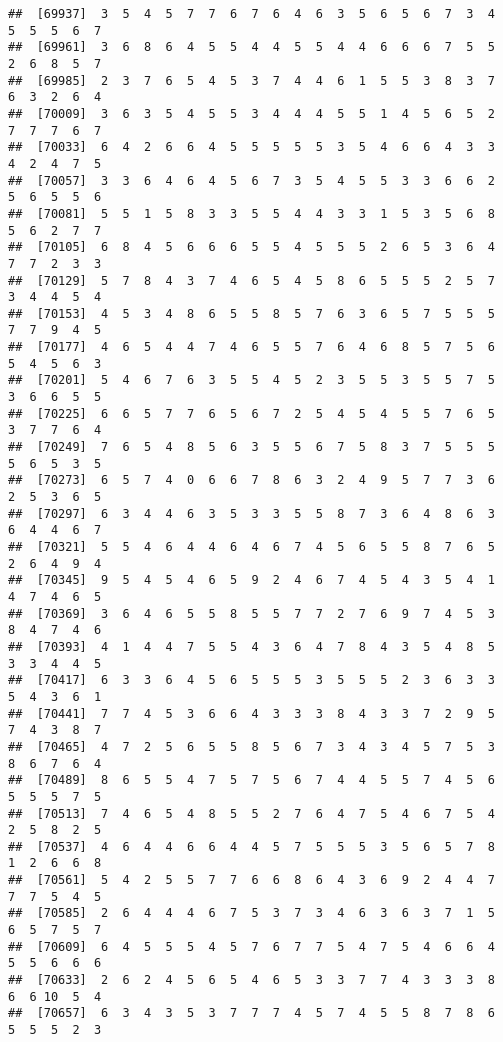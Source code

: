 \documentclass[
]{book}
\begin{document}
\begin{verbatim}
##  [69937]  3  5  4  5  7  7  6  7  6  4  6  3  5  6  5  6  7  3  4  5  5  5  6  7
##  [69961]  3  6  8  6  4  5  5  4  4  5  5  4  4  6  6  6  7  5  5  2  6  8  5  7
##  [69985]  2  3  7  6  5  4  5  3  7  4  4  6  1  5  5  3  8  3  7  6  3  2  6  4
##  [70009]  3  6  3  5  4  5  5  3  4  4  4  5  5  1  4  5  6  5  2  7  7  7  6  7
##  [70033]  6  4  2  6  6  4  5  5  5  5  5  3  5  4  6  6  4  3  3  4  2  4  7  5
##  [70057]  3  3  6  4  6  4  5  6  7  3  5  4  5  5  3  3  6  6  2  5  6  5  5  6
##  [70081]  5  5  1  5  8  3  3  5  5  4  4  3  3  1  5  3  5  6  8  5  6  2  7  7
##  [70105]  6  8  4  5  6  6  6  5  5  4  5  5  5  2  6  5  3  6  4  7  7  2  3  3
##  [70129]  5  7  8  4  3  7  4  6  5  4  5  8  6  5  5  5  2  5  7  3  4  4  5  4
##  [70153]  4  5  3  4  8  6  5  5  8  5  7  6  3  6  5  7  5  5  5  7  7  9  4  5
##  [70177]  4  6  5  4  4  7  4  6  5  5  7  6  4  6  8  5  7  5  6  5  4  5  6  3
##  [70201]  5  4  6  7  6  3  5  5  4  5  2  3  5  5  3  5  5  7  5  3  6  6  5  5
##  [70225]  6  6  5  7  7  6  5  6  7  2  5  4  5  4  5  5  7  6  5  3  7  7  6  4
##  [70249]  7  6  5  4  8  5  6  3  5  5  6  7  5  8  3  7  5  5  5  5  6  5  3  5
##  [70273]  6  5  7  4  0  6  6  7  8  6  3  2  4  9  5  7  7  3  6  2  5  3  6  5
##  [70297]  6  3  4  4  6  3  5  3  3  5  5  8  7  3  6  4  8  6  3  6  4  4  6  7
##  [70321]  5  5  4  6  4  4  6  4  6  7  4  5  6  5  5  8  7  6  5  2  6  4  9  4
##  [70345]  9  5  4  5  4  6  5  9  2  4  6  7  4  5  4  3  5  4  1  4  7  4  6  5
##  [70369]  3  6  4  6  5  5  8  5  5  7  7  2  7  6  9  7  4  5  3  8  4  7  4  6
##  [70393]  4  1  4  4  7  5  5  4  3  6  4  7  8  4  3  5  4  8  5  3  3  4  4  5
##  [70417]  6  3  3  6  4  5  6  5  5  5  3  5  5  5  2  3  6  3  3  5  4  3  6  1
##  [70441]  7  7  4  5  3  6  6  4  3  3  3  8  4  3  3  7  2  9  5  7  4  3  8  7
##  [70465]  4  7  2  5  6  5  5  8  5  6  7  3  4  3  4  5  7  5  3  8  6  7  6  4
##  [70489]  8  6  5  5  4  7  5  7  5  6  7  4  4  5  5  7  4  5  6  5  5  5  7  5
##  [70513]  7  4  6  5  4  8  5  5  2  7  6  4  7  5  4  6  7  5  4  2  5  8  2  5
##  [70537]  4  6  4  4  6  6  4  4  5  7  5  5  5  3  5  6  5  7  8  1  2  6  6  8
##  [70561]  5  4  2  5  5  7  7  6  6  8  6  4  3  6  9  2  4  4  7  7  7  5  4  5
##  [70585]  2  6  4  4  4  6  7  5  3  7  3  4  6  3  6  3  7  1  5  6  5  7  5  7
##  [70609]  6  4  5  5  5  4  5  7  6  7  7  5  4  7  5  4  6  6  4  5  5  6  6  6
##  [70633]  2  6  2  4  5  6  5  4  6  5  3  3  7  7  4  3  3  3  8  6  6 10  5  4
##  [70657]  6  3  4  3  5  3  7  7  7  4  5  7  4  5  5  8  7  8  6  5  5  5  2  3

\end{verbatim}
\end{document}
